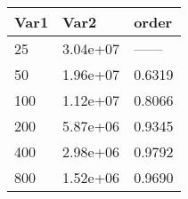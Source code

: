 \begin{tabular}{lll}
Var1 & Var2 & order \\ 
\hline 
25 & 3.04e+07 & ------ \\ 
50 & 1.96e+07 & 0.6319 \\ 
100 & 1.12e+07 & 0.8066 \\ 
200 & 5.87e+06 & 0.9345 \\ 
400 & 2.98e+06 & 0.9792 \\ 
800 & 1.52e+06 & 0.9690 \\ 
\hline 
\end{tabular}